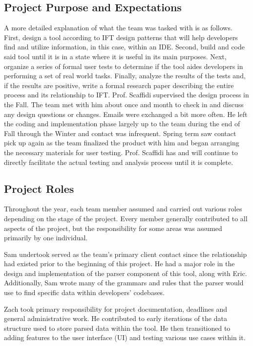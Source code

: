 \documentclass[letterpaper,10pt,titlepage,draftclsnofoot,onecolumn,onesided] {IEEEtran}
\begin{document}
\subsection{Project Purpose and Expectations}
A more detailed explanation of what the team was tasked with is as follows.
First, design a tool according to IFT design patterns that will help developers find and utilize information, in this case, within an IDE.
Second, build and code said tool until it is in a state where it is useful in its main purposes.
Next, organize a series of formal user tests to determine if the tool aides developers in performing a set of real world tasks.
Finally, analyze the results of the tests and, if the results are positive, write a formal research paper describing the entire process and its relationship to IFT.
Prof. Scaffidi supervised the design process in the Fall. The team met with him about once and month to check in and discuss any design questions or changes. 
Emails were exchanged a bit more often. 
He left the coding and implementation phase largely up to the team during the end of Fall through the Winter and contact was infrequent. 
Spring term saw contact pick up again as the team finalized the product with him and began arranging the necessary materials for user testing. 
Prof. Scaffidi has and will continue to directly facilitate the actual testing and analysis process until it is complete.

\subsection{Project Roles}
Throughout the year, each team member assumed and carried out various roles depending on the stage of the project. 
Every member generally contributed to all aspects of the project, but the responsibility for some areas was assumed primarily by one individual.

Sam undertook served as the team's primary client contact since the relationship had existed prior to the beginning of this project. 
He had a major role in the design and implementation of the parser component of this tool, along with Eric. 
Additionally, Sam wrote many of the grammars and rules that the parser would use to find specific data within developers' codebases. 

Zach took primary responsibility for project documentation, deadlines and general administrative work. He contributed to early iterations of the data structure used to store parsed data within the tool. 
He then transitioned to adding features to the user interface (UI) and testing various use cases within it.
\end{document}
